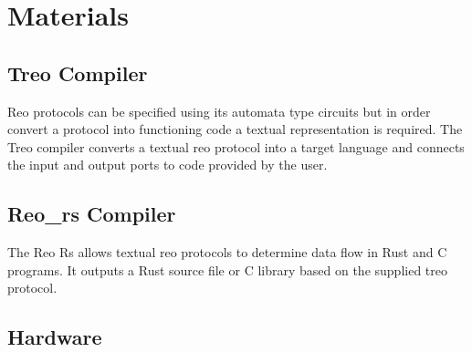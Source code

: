 \section{Materials}
\subsection{Treo Compiler}
Reo protocols can be specified using its automata type circuits but in order convert a protocol into functioning code a textual representation is required. The Treo \cite{treo} compiler \cite{reo:git} converts a textual reo protocol into a target language and connects the input and output ports to code provided by the user.

\subsection{Reo\_rs Compiler}
The Reo Rs \cite{reors:git} allows textual reo protocols to determine data flow in Rust and C programs. It outputs a Rust source file or C library based on the supplied treo protocol.

\subsection{Hardware}
